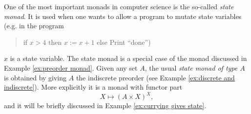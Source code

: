 \begin{remark}\label{rem:state monad}

One of the most important monads in computer science is the so-called {\em state monad}. It is used when one wants to allow a program to mutate state variables (e.g. in the program 
\begin{quote}if $x>4$ then $x:=x+1$ else Print “done”)\end{quote}
$x$ is a state variable. The state monad is a special case of the monad discussed in Example \ref{ex:preorder monad}. Given any set $A$, the usual {\em state monad of type $A$} is obtained by giving $A$ the indiscrete preorder (see Example \ref{ex:discrete and indiscrete}). More explicitly it is a monad with functor part $$X\mapsto (A\times X)^X,$$ and it will be briefly discussed in Example \ref{ex:currying gives state}.

\end{remark}

